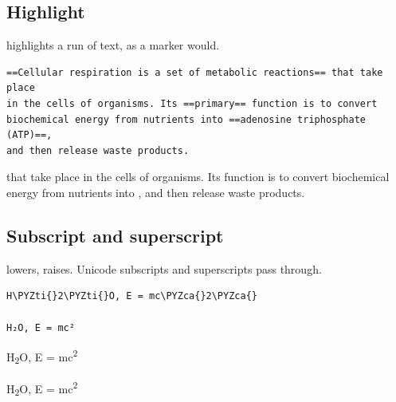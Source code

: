 \documentclass[a4paper,twoside]{article}
\begin{document}
\subsection{Highlight}
 highlights a run of text, as a marker would.
\begin{tscode}[lang=md, engine=pygments]
\begin{Verbatim}[commandchars=\\\{\},breaklines, breakanywhere, commandchars=\\\{\}]
==Cellular respiration is a set of metabolic reactions== that take place
in the cells of organisms. Its ==primary== function is to convert
biochemical energy from nutrients into ==adenosine triphosphate (ATP)==,
and then release waste products.
\end{Verbatim}
\end{tscode}
\begin{displayquote}
 that take place in the
cells of organisms. Its  function is to convert biochemical energy
from nutrients into , and then release waste
products.
\end{displayquote}
\subsection{Subscript and superscript}
 lowers,  raises. Unicode subscripts and superscripts pass through.
\begin{tscode}[lang=md, engine=pygments]
\begin{Verbatim}[commandchars=\\\{\},breaklines, breakanywhere, commandchars=\\\{\}]
H\PYZti{}2\PYZti{}O, E = mc\PYZca{}2\PYZca{}

H₂O, E = mc²
\end{Verbatim}
\end{tscode}
\begin{displayquote}
H\textsubscript{2}O, E = mc\textsuperscript{2}

H\textsubscript{2}O, E = mc\textsuperscript{2}
\end{displayquote}
\end{document}
